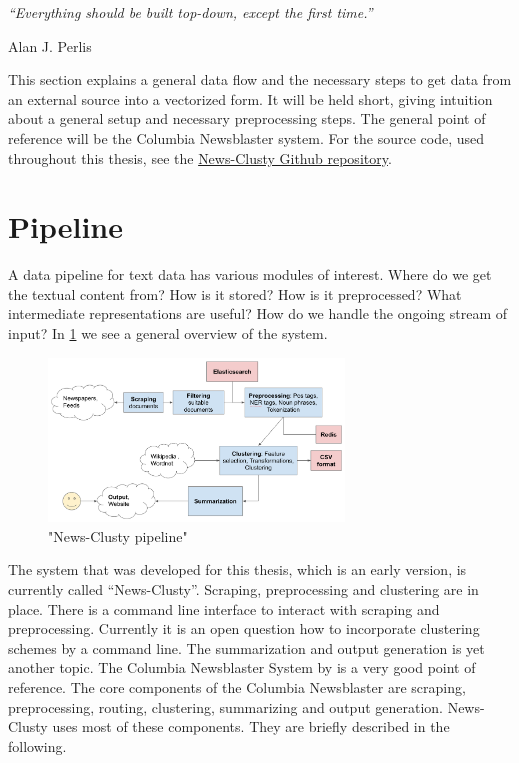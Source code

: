 \epigraph{\emph{
  ``Everything should be built top-down, except the first time.''
}}{ Alan J. Perlis }
 
This section explains a general data flow and the necessary steps to get data from an external source into a vectorized form. It will be held short, giving intuition about a general setup and necessary preprocessing steps. The general point of reference will be the Columbia Newsblaster system. For the source code, used throughout this thesis, see the \href{https://github.com/sacry-/text-mining-haw-bachelor/}{News-Clusty Github repository}.

\section{Pipeline}
\label{sec:pipeline}
  
  A data pipeline for text data has various modules of interest. Where do we get the textual content from? How is it stored? How is it preprocessed? What intermediate representations are useful? How do we handle the ongoing stream of input? In \ref{news_clusty} we see a general overview of the system.

  \begin{figure}[h!]
    \centering
      \includegraphics[width=0.7\textwidth]{news_clusty.png}
      \caption{"News-Clusty pipeline"}
      \label{news_clusty}
  \end{figure}

  The system that was developed for this thesis, which is an early version, is currently called ``News-Clusty''. Scraping, preprocessing and clustering are in place. There is a command line interface to interact with scraping and preprocessing. Currently it is an open question how to incorporate clustering schemes by a command line. The summarization and output generation is yet another topic. The Columbia Newsblaster System by \cite{ColumbiaMultiDoc2001} is a very good point of reference. The core components of the Columbia Newsblaster are scraping, preprocessing, routing, clustering, summarizing and output generation. News-Clusty uses most of these components. They are briefly described in the following.

